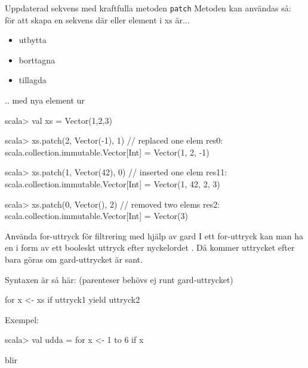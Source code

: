 \begin{Slide}{Uppdaterad sekvens med kraftfulla metoden \texttt{patch}}
  Metoden  kan användas så:  \\för att skapa en  sekvens där  eller  element i xs är...  
  \begin{itemize}
    \item utbytta 
    \item borttagna 
    \item tillagda 
  \end{itemize}
  .. med nya element ur  
\begin{REPL}
scala> val xs = Vector(1,2,3)

scala> xs.patch(2, Vector(-1), 1)     // replaced one elem
res0: scala.collection.immutable.Vector[Int] = Vector(1, 2, -1)

scala> xs.patch(1, Vector(42), 0)     // inserted one elem
res11: scala.collection.immutable.Vector[Int] = Vector(1, 42, 2, 3)

scala> xs.patch(0, Vector(), 2)       // removed two elems
res2: scala.collection.immutable.Vector[Int] = Vector(3)
 
\end{REPL}
\end{Slide}

\begin{Slide}{Använda for-uttryck för filtrering med hjälp av gard}
I ett for-uttryck kan man ha en   i form av ett booleskt uttryck efter nyckelordet . Då kommer uttrycket efter  bara göras om gard-uttrycket är sant.

\vspace{1em}

Syntaxen är så här: (parenteser behövs ej runt gard-uttrycket)
\begin{Code}[basicstyle=\ttfamily\SlideFontSize{12}{14}]
for x <- xs if uttryck1 yield uttryck2
\end{Code}
\pause
Exempel:
\begin{REPLnonum}
scala> val udda = for x <- 1 to 6 if x %
\end{REPLnonum}
\pause
{} blir 
\end{Slide}


